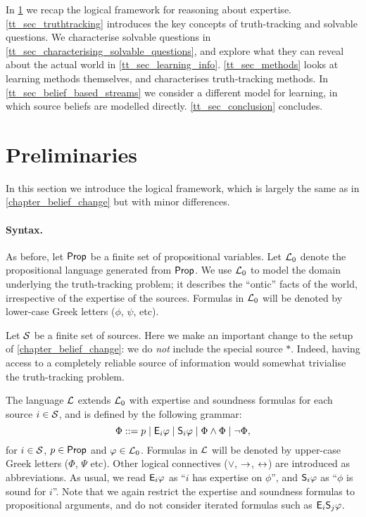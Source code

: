\begin{chapteroutline}
    In \cref{tt_sec_preliminaries} we recap the logical framework for reasoning
    about expertise. \cref{tt_sec_truthtracking} introduces the key concepts of
    truth-tracking and solvable questions. We characterise solvable questions in
    \cref{tt_sec_characterising_solvable_questions}, and explore what they can reveal
    about the actual world in \cref{tt_sec_learning_info}. \cref{tt_sec_methods} looks at
    learning methods themselves, and characterises truth-tracking methods. In
    \cref{tt_sec_belief_based_streams} we consider a different model for
    learning, in which source beliefs are modelled directly.
    \cref{tt_sec_conclusion} concludes.
\end{chapteroutline}

\section{Preliminaries}
\label{tt_sec_preliminaries}

In this section we introduce the logical framework, which is largely the same
as in \cref{chapter_belief_change} but with minor differences.

\paragraph{Syntax.}

As before, let $\propvars$ be a finite set of propositional variables. Let $\Lprop$
denote the propositional language generated from $\propvars$. We use $\Lprop$
to model the domain underlying the truth-tracking problem; it describes the
``ontic'' facts of the world, irrespective of the expertise of the sources.
Formulas in $\Lprop$ will be denoted by lower-case Greek letters ($\phi$,
$\psi$, etc).

Let $\srcs$ be a finite set of sources. Here we make an important change to the
setup of \cref{chapter_belief_change}: we do \emph{not} include the special
source $\ast$. Indeed, having access to a completely reliable source of
information would somewhat trivialise the truth-tracking problem.

The language $\L$ extends $\Lprop$ with
expertise and soundness formulas for each source $i \in \srcs$, and is defined
by the following grammar:
\[
    \Phi
    ::= p
    \mid \E_i\phi
    \mid \S_i\phi
    \mid \Phi \land \Phi
    \mid \neg\Phi,
\]
for $i \in \srcs$, $p \in \propvars$ and $\phi \in \Lprop$. Formulas in $\L$
will be denoted by upper-case Greek letters ($\Phi$, $\Psi$ etc). Other logical
connectives ($\lor$, $\limplies$, $\liff$) are introduced as abbreviations.  As
usual, we read $\E_i\phi$ as ``$i$ has expertise on $\phi$'', and $\S_i\phi$ as
``$\phi$ is sound for $i$''. Note that we again restrict the expertise and
soundness formulas to propositional arguments, and do not consider iterated
formulas such as $\E_i\S_j\phi$.

